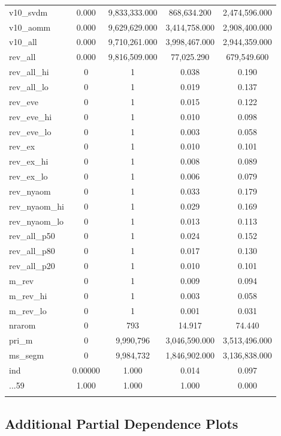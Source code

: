 \documentclass[11pt,]{article}
\begin{document}
\begin{table}[!htbp]
\begin{tabular}{@{\extracolsep{5pt}}lcccc}
v10\_svdm & 0.000 & 9,833,333.000 & 868,634.200 & 2,474,596.000 \\ 
v10\_aomm & 0.000 & 9,629,629.000 & 3,414,758.000 & 2,908,400.000 \\ 
v10\_all & 0.000 & 9,710,261.000 & 3,998,467.000 & 2,944,359.000 \\ 
rev\_all & 0.000 & 9,816,509.000 & 77,025.290 & 679,549.600 \\ 
rev\_all\_hi & 0 & 1 & 0.038 & 0.190 \\ 
rev\_all\_lo & 0 & 1 & 0.019 & 0.137 \\ 
rev\_eve & 0 & 1 & 0.015 & 0.122 \\ 
rev\_eve\_hi & 0 & 1 & 0.010 & 0.098 \\ 
rev\_eve\_lo & 0 & 1 & 0.003 & 0.058 \\ 
rev\_ex & 0 & 1 & 0.010 & 0.101 \\ 
rev\_ex\_hi & 0 & 1 & 0.008 & 0.089 \\ 
rev\_ex\_lo & 0 & 1 & 0.006 & 0.079 \\ 
rev\_nyaom & 0 & 1 & 0.033 & 0.179 \\ 
rev\_nyaom\_hi & 0 & 1 & 0.029 & 0.169 \\ 
rev\_nyaom\_lo & 0 & 1 & 0.013 & 0.113 \\ 
rev\_all\_p50 & 0 & 1 & 0.024 & 0.152 \\ 
rev\_all\_p80 & 0 & 1 & 0.017 & 0.130 \\ 
rev\_all\_p20 & 0 & 1 & 0.010 & 0.101 \\ 
m\_rev & 0 & 1 & 0.009 & 0.094 \\ 
m\_rev\_hi & 0 & 1 & 0.003 & 0.058 \\ 
m\_rev\_lo & 0 & 1 & 0.001 & 0.031 \\ 
nrarom & 0 & 793 & 14.917 & 74.440 \\ 
pri\_m & 0 & 9,990,796 & 3,046,590.000 & 3,513,496.000 \\ 
ms\_segm & 0 & 9,984,732 & 1,846,902.000 & 3,136,838.000 \\ 
ind & 0.00000 & 1.000 & 0.014 & 0.097 \\ 
...59 & 1.000 & 1.000 & 1.000 & 0.000 \\ 
\hline \\[-1.8ex] 
\end{tabular} 
\end{table}

\restoregeometry

\hypertarget{additional-partial-dependence-plots}{%
\subsection{\texorpdfstring{Additional Partial Dependence Plots
\label{chap:ap2}}{Additional Partial Dependence Plots }}\label{additional-partial-dependence-plots}}
\end{document}

